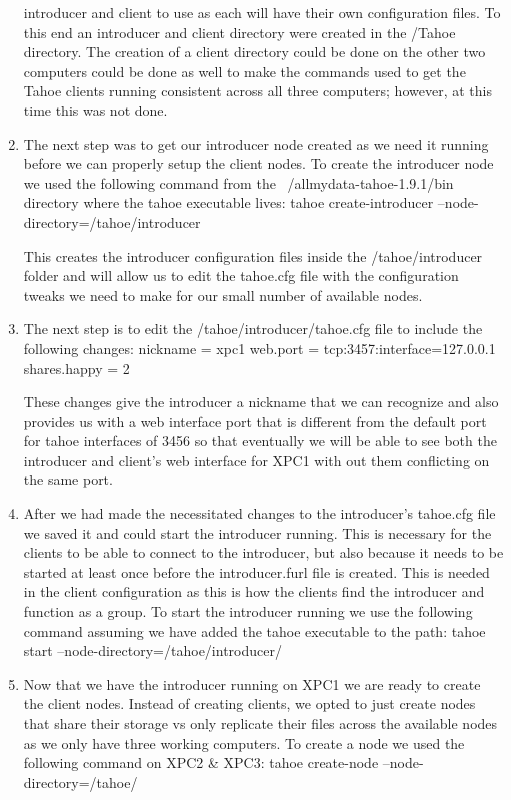 \documentclass[11pt]{article}
\begin{document}
\begin{enumerate}
  introducer and client to use as each will have their own
  configuration files. To this end an introducer and client directory
  were created in the /Tahoe directory. The creation of a client
  directory could be done on the other two computers could be done as
  well to make the commands used to get the Tahoe clients running
  consistent across all three computers; however, at this time this
  was not done.
\item The next step was to get our introducer node created as we need
  it running before we can properly setup the client nodes. To create
  the introducer node we used the following command from the
  ~/allmydata-tahoe-1.9.1/bin directory where the tahoe executable
  lives: \subitem tahoe create-introducer
  --node-directory=/tahoe/introducer

This creates the introducer configuration files inside the
/tahoe/introducer folder and will allow us to edit the tahoe.cfg file
with the configuration tweaks we need to make for our small number of
available nodes.
\item The next step is to edit the /tahoe/introducer/tahoe.cfg file to
  include the following changes: \subitem nickname = xpc1 \subitem
  web.port = tcp:3457:interface=127.0.0.1 \subitem shares.happy = 2

These changes give the introducer a nickname that we can recognize and
also provides us with a web interface port that is different from the
default port for tahoe interfaces of 3456 so that eventually we will
be able to see both the introducer and client's web interface for XPC1
with out them conflicting on the same port.

\item After we had made the necessitated changes to the introducer's
  tahoe.cfg file we saved it and could start the introducer
  running. This is necessary for the clients to be able to connect to
  the introducer, but also because it needs to be started at least
  once before the introducer.furl file is created. This is needed in
  the client configuration as this is how the clients find the
  introducer and function as a group. To start the introducer running
  we use the following command assuming we have added the tahoe
  executable to the path: \subitem tahoe start
  --node-directory=/tahoe/introducer/

\item Now that we have the introducer running on XPC1 we are ready to
  create the client nodes. Instead of creating clients, we opted to
  just create nodes that share their storage vs only replicate their
  files across the available nodes as we only have three working
  computers. To create a node we used the following command on XPC2 \&
  XPC3: \subitem tahoe create-node --node-directory=/tahoe/


\end{enumerate}
\end{document}

